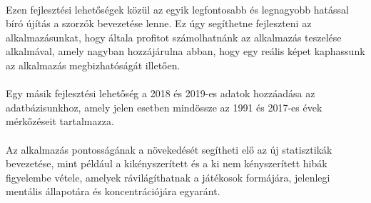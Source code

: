 \paragraph{}
Ezen fejlesztési lehetőségek közül az egyik legfontosabb és legnagyobb hatással bíró újítás a szorzók bevezetése lenne. Ez úgy segíthetne fejleszteni az alkalmazásunkat, hogy általa profitot számolhatnánk az alkalmazás teszelése alkalmával, amely nagyban hozzájárulna abban, hogy egy reális képet kaphassunk az alkalmazás megbizhatóságát illetően.

\paragraph{}
Egy másik fejlesztési lehetőség a 2018 és 2019-es adatok hozzáadása az adatbázisunkhoz, amely jelen esetben mindössze az 1991 és 2017-es évek mérkőzéseit tartalmazza.

\paragraph{}
Az alkalmazás pontosságának a növekedését segítheti elő az új statisztikák bevezetése, mint például a kikényszerített és a ki nem kényszerített hibák figyelembe vétele, amelyek rávilágíthatnak a játékosok formájára, jelenlegi mentális állapotára és koncentrációjára egyaránt.